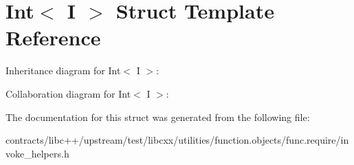 \hypertarget{struct_int}{}\section{Int$<$ I $>$ Struct Template Reference}
\label{struct_int}


Inheritance diagram for Int$<$ I $>$\+:


Collaboration diagram for Int$<$ I $>$\+:


The documentation for this struct was generated from the following file\+:\begin{DoxyCompactItemize}
\item 
contracts/libc++/upstream/test/libcxx/utilities/function.\+objects/func.\+require/invoke\+\_\+helpers.\+h\end{DoxyCompactItemize}
